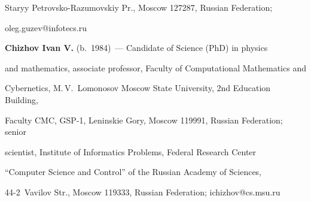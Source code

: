 Staryy Petrovsko-Razumovskiy Pr., Moscow 127287, Russian Federation; 


\mbox{oleg.guzev@infotecs.ru}





\vspace*{3pt}





\noindent


\textbf{Chizhov Ivan V.} (b.\ 1984)~--- Candidate of Science (PhD) in physics 


and mathematics, associate professor, Faculty of Computational Mathematics and 


Cybernetics, M.\,V.~Lomonosov Moscow State University, 2nd Education Building, 


Faculty CMC, GSP-1, Leninskie Gory, Moscow 119991, Russian Federation; senior 


scientist, Institute of Informatics Problems, Federal Research Center 


``Computer Science and Control'' of the Russian Academy of Sciences,  


44-2~Vavilov Str., Moscow 119333, Russian Federation; \mbox{ichizhov@cs.msu.ru}





\label{end\stat}








\renewcommand{\bibname}{\protect\rm Литература}


